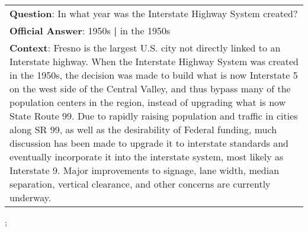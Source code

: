 \begin{figure*}[ht]
{\begin{tabular}{p{}}
            \textbf{Question}: In what year was the Interstate Highway System created?                                                                                                                                                                                                                                                                                                                                                                                                                                                                                                                                                                                                                                                                                                               \\
            \textbf{Official Answer}: 1950s \textbf{|} in the 1950s                                                                                                                                                                                                                                                                                                                                                                                                                                                                                                                                                                                                                                                                                                                                  \\
            \textbf{Context}: Fresno is the largest U.S. city not directly linked to an Interstate highway. When the Interstate Highway System was created in the 1950s, the decision was made to build what is now Interstate 5 on the west side of the Central Valley, and thus bypass many of the population centers in the region, instead of upgrading what is now State Route 99. Due to rapidly raising population and traffic in cities along SR 99, as well as the desirability of Federal funding, much discussion has been made to upgrade it to interstate standards and eventually incorporate it into the interstate system, most likely as Interstate 9. Major improvements to signage, lane width, median separation, vertical clearance, and other concerns are currently underway. \\
        \end{tabular}
    };
    \label{fig:ex-5725fe63ec44d21400f3d7de}
\end{figure*}

